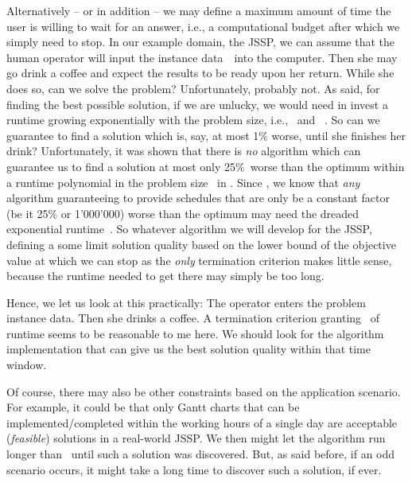 Alternatively -- or in addition -- we may define a maximum amount of time the user is willing to wait for an answer, i.e., a computational budget after which we simply need to stop.%
%
\endhsection%
%
%
\label{sec:jssp:termination}%
%
In our example domain, the \gls{JSSP}, we can assume that the human operator will input the instance data~\instance\ into the computer.
Then she may go drink a coffee and expect the results to be ready upon her return.
While she does so, can we solve the problem?
Unfortunately, probably not.
As said, for finding the best possible solution, if we are unlucky, we would need in invest a runtime growing exponentially with the problem size, i.e., \jsspMachines\ and \jsspJobs~\cite{LLRKS1993SASAAC,CPW1998AROMSCAAA}.
So can we guarantee to find a solution which is, say, at most 1\% worse, until she finishes her drink?
Unfortunately, it was shown that there is \emph{no} algorithm which can guarantee us to find a solution at most only 25\%~worse than the optimum within a runtime polynomial in the problem size~\cite{WHHHLSS1997SSS,JMSO2005ASFJSSPWCPT} in \citeyear{WHHHLSS1997SSS}.
Since \citeyear{MS2011HOAFAJSSP}, we know that \emph{any} algorithm guaranteeing to provide schedules that are only be a constant factor (be it 25\% or 1'000'000) worse than the optimum may need the dreaded exponential runtime~\cite{MS2011HOAFAJSSP}.
So whatever algorithm we will develop for the \gls{JSSP}, defining a some limit solution quality based on the lower bound of the objective value at which we can stop as the \emph{only} termination criterion makes little sense, because the runtime needed to get there may simply be too long.

Hence, we let us look at this practically:
The operator enters the problem instance data.
Then she drinks a coffee.
A termination criterion granting \jsspRuntime\ of runtime seems to be reasonable to me here.
We should look for the algorithm implementation that can give us the best solution quality within that time window.

Of course, there may also be other constraints based on the application scenario.
For example, it could be that only Gantt charts that can be implemented/completed within the working hours of a single day are acceptable (\emph{feasible}) solutions in a real-world \gls{JSSP}.
We then might let the algorithm run longer than \jsspRuntime\ until such a solution was discovered.
But, as said before, if an odd scenario occurs, it might take a long time to discover such a solution, if ever.


